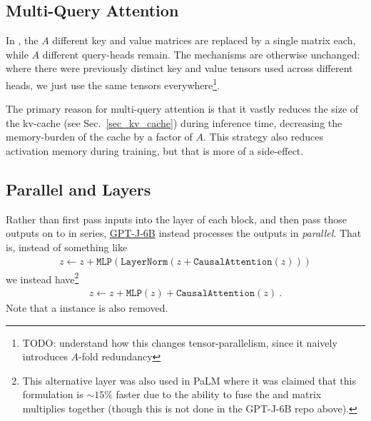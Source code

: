 \documentclass[11pt]{article}
\begin{document}
\subsection{Multi-Query Attention \label{subsec_multi_query_attn}}

In \cite{shazeer2019fast}, the $ A $ different key and value matrices are replaced by a single
matrix each, while $ A$ different query-heads remain. The mechanisms are otherwise unchanged: where
there were previously distinct key and value tensors used across different heads, we just use the same
tensors everywhere\footnote{TODO: understand how this changes tensor-parallelism, since it naively
	introduces $ A $-fold redundancy}.


The primary reason for multi-query attention is that it vastly reduces the size of the kv-cache (see
Sec.~\ref{sec_kv_cache}) during inference time, decreasing the memory-burden of the cache by a
factor of $ A $. This strategy also reduces activation memory during training, but that is more of a
side-effect.


\subsection{Parallel  and  Layers}

Rather than first pass inputs into the  layer of each block, and then pass
those outputs on to  in series, \href{https://github.com/kingoflolz/mesh-transformer-jax/blob/f8315e3003033b23f21d78361b288953064e0e76/mesh_transformer/layers.py#L303}{GPT-J-6B}
instead processes the  outputs in \textit{parallel}. That is, instead of something
like
\begin{align}
	z \leftarrow z + \texttt{MLP}\left ( \texttt{LayerNorm}\left ( z + \texttt{CausalAttention}\left ( z \right ) \right ) \right )
\end{align}
we instead have\footnote{This alternative layer was also used in PaLM \cite{chowdhery2022palm} where it
	was claimed that this formulation is $\sim 15\%$ faster due to the ability to fuse the 
	and  matrix multiplies together (though this is not done in the GPT-J-6B repo above).}
\begin{align}
	z \leftarrow z + \texttt{MLP}\left ( z \right )    + \texttt{CausalAttention}\left ( z \right )\ .
\end{align}
Note that a  instance is also removed.
\end{document}
